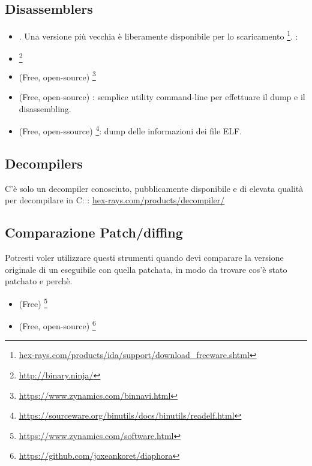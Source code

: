 \subsection{Disassemblers}


\begin{itemize}
\item {}. Una versione più vecchia è liberamente disponibile per lo scaricamento
\footnote{\href{http://go.yurichev.com/17031}{hex-rays.com/products/ida/support/download\_freeware.shtml}}.
\ShortHotKeyCheatsheet: 

\item {}\footnote{\url{http://binary.ninja/}}

\item (Free, open-source) \footnote{\url{https://www.zynamics.com/binnavi.html}}

\item (Free, open-source) : semplice utility command-line per effettuare il dump e il disassembling.

\item (Free, open-ssource) \footnote{\url{https://sourceware.org/binutils/docs/binutils/readelf.html}}:
dump delle informazioni dei file ELF.
\end{itemize}

\subsection{Decompilers}

C'è solo un decompiler conosciuto, pubblicamente disponibile e di elevata qualità per decompilare in C: :
\href{http://go.yurichev.com/17033}{hex-rays.com/products/decompiler/}


\subsection{Comparazione Patch/diffing}

Potresti voler utilizzare questi strumenti quando devi comparare la versione originale di un eseguibile con quella patchata,
in modo da trovare cos'è stato patchato e perchè.

\begin{itemize}
\item (Free) \footnote{\url{https://www.zynamics.com/software.html}}

\item (Free, open-source) \footnote{\url{https://github.com/joxeankoret/diaphora}}
\end{itemize}

